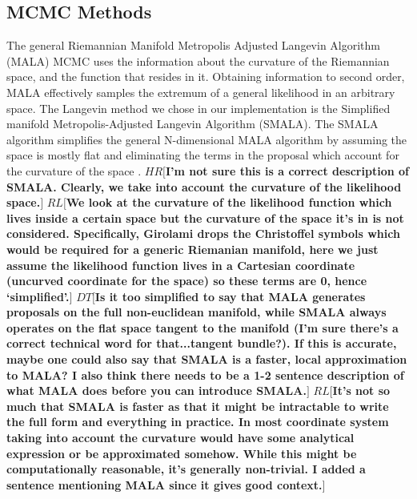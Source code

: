 \documentclass{aa}
\def\memohr#1{\color{blue}$HR[${\bf #1}$]$ \color{black}}
\def\memodt#1{\color{green}$DT[${\bf #1}$]$ \color{black}}
\def\memorl#1{\color{gray}$RL[${\bf #1}$]$ \color{black}}
\begin{document}
\subsection{MCMC Methods}
The general Riemannian Manifold Metropolis Adjusted Langevin Algorithm (MALA) MCMC uses the information about the curvature of the Riemannian space, and the function that resides in it. 
Obtaining information to second order, MALA effectively samples the extremum of a general likelihood in an arbitrary space.
The Langevin method we chose in our implementation is the Simplified manifold Metropolis-Adjusted Langevin Algorithm (SMALA). 
The SMALA algorithm simplifies the general N-dimensional MALA algorithm by assuming the space is mostly flat and eliminating the terms in the proposal which account for the curvature of the space \citep{Girolami2011}.
\memohr{I'm not sure this is a correct description of SMALA. Clearly, we take into account the curvature of the likelihood space.}
\memorl{We look at the curvature of the likelihood function which lives inside a certain space but the curvature of the space it's in is not considered. Specifically, Girolami drops the Christoffel symbols which would be required for a generic Riemanian manifold, here we just assume the likelihood function lives in a Cartesian coordinate (uncurved coordinate for the space) so these terms are 0, hence `simplified'.}
\memodt{Is it too simplified to say that MALA generates proposals on the full non-euclidean manifold, while SMALA always operates on the flat space tangent to the manifold (I'm sure there's a correct technical word for that...tangent bundle?). If this is accurate, maybe one could also say that SMALA is a faster, local approximation to MALA? I also think there needs to be a 1-2 sentence description of what MALA does before you can introduce SMALA.}
\memorl{It's not so much that SMALA is faster as that it might be intractable to write the full form and everything in practice. In most coordinate system taking into account the curvature would have some analytical expression or be approximated somehow. While this might be computationally reasonable, it's generally non-trivial. I added a sentence mentioning MALA since it gives good context.}
\end{document}
